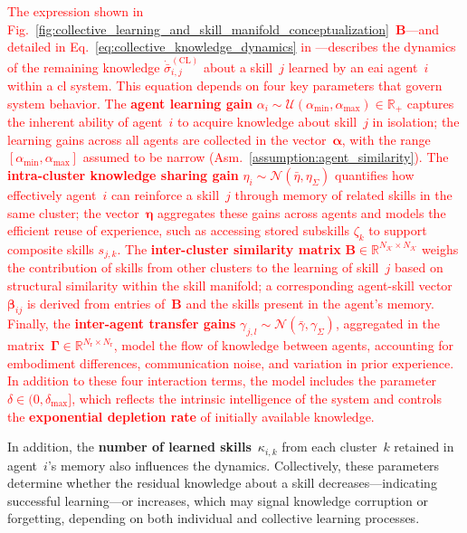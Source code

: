 \documentclass[12pt]{article}
\newcommand\myhl[1]{\textcolor{red}{#1}}
\begin{document}
\myhl{The expression shown in Fig.~\ref{fig:collective_learning_and_skill_manifold_conceptualization}~\textbf{B}---and detailed in Eq.~\eqref{eq:collective_knowledge_dynamics} in \nameref{sec:methods}---describes the dynamics of the remaining knowledge $\dot{\bar{\sigma}}^{(\mathrm{CL})}_{i,j}$ about a skill~$j$ learned by an \ac{eai} agent~$i$ within a \ac{cl} system. This equation depends on four key parameters that govern system behavior. The \textbf{agent learning gain} $\alpha_i \sim \mathcal{U}(\alpha_{\text{min}},\alpha_{\text{max}}) \in \mathbb{R}_+$ captures the inherent ability of agent~$i$ to acquire knowledge about skill~$j$ in isolation; the learning gains across all agents are collected in the vector~$\bm{\alpha}$, with the range $[\alpha_{\text{min}}, \alpha_{\text{max}}]$ assumed to be narrow (Asm.~\ref{assumption:agent_similarity}). The \textbf{intra-cluster knowledge sharing gain} $\eta_i \sim \mathcal{N}(\bar{\eta},\eta_{\Sigma})$ quantifies how effectively agent~$i$ can reinforce a skill~$j$ through memory of related skills in the same cluster; the vector~$\bm{\eta}$ aggregates these gains across agents and models the efficient reuse of experience, such as accessing stored subskills $\zeta_k$ to support composite skills $s_{j,k}$. The \textbf{inter-cluster similarity matrix} $\bm{B} \in \mathbb{R}^{N_\mathcal{K} \times N_\mathcal{K}}$ weighs the contribution of skills from other clusters to the learning of skill~$j$ based on structural similarity within the skill manifold; a corresponding agent-skill vector~$\bm{\beta}_{ij}$ is derived from entries of~$\bm{B}$ and the skills present in the agent’s memory. Finally, the \textbf{inter-agent transfer gains} $\gamma_{j,l} \sim \mathcal{N}(\bar{\gamma},\gamma_\Sigma)$, aggregated in the matrix~$\bm{\Gamma} \in \mathbb{R}^{N_\mathrm{r} \times N_\mathrm{r}}$, model the flow of knowledge between agents, accounting for embodiment differences, communication noise, and variation in prior experience. In addition to these four interaction terms, the model includes the parameter $\delta \in (0,\delta_{\text{max}}]$, which reflects the intrinsic intelligence of the system and controls the \textbf{exponential depletion rate} of initially available knowledge.}

In addition, the \textbf{number of learned skills}~$\kappa_{i,k}$ from each cluster~$k$ retained in agent~$i$’s memory also influences the dynamics. Collectively, these parameters determine whether the residual knowledge about a skill decreases---indicating successful learning---or increases, which may signal knowledge corruption or forgetting, depending on both individual and collective learning processes.
\end{document}
